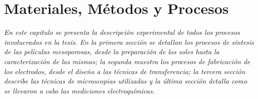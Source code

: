  \newcommand{\NoBiblioMat}[1]{
 \ifthenelse{\equal{#1}{verdadero}}{}{}
 \NoBiblioMat{verdadero}}


 \FormatoCapituloUnaLinea

 \chapter{Materiales, Métodos y Procesos}\label{chap:Materiales}

 \thispagestyle{empty}
	
  \noindent\textit{En este capitulo se presenta la descripción experimental de todos los procesos involucrados en la tesis. En la primera sección se detallan los procesos de síntesis de las películas mesoporosas, desde la preparación de los soles hasta la caracterización de las mismas; la segunda muestra los procesos de fabricación de los electrodos, desde el diseño a las técnicas de transferencia; la tercera sección describe las técnicas de microscopias utilizadas y la última sección detalla como se llevaron a cabo las mediciones electroquímicas.}


 \vfill
 \minitoc
 \newpage


